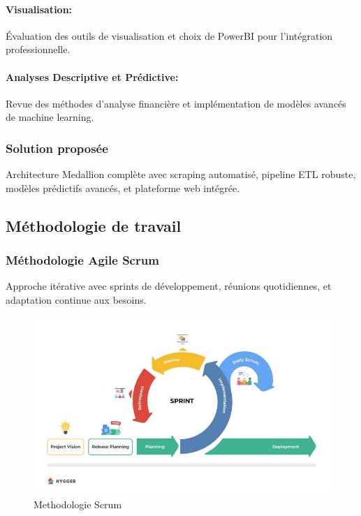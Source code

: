 \paragraph{Visualisation:}
Évaluation des outils de visualisation et choix de PowerBI pour l'intégration professionnelle.

\paragraph{Analyses Descriptive et Prédictive:}
Revue des méthodes d'analyse financière et implémentation de modèles avancés de machine learning.

\subsubsection{Solution proposée}
Architecture Medallion complète avec scraping automatisé, pipeline ETL robuste, modèles prédictifs avancés, et plateforme web intégrée.

\subsection{Méthodologie de travail}
\subsubsection{Méthodologie Agile Scrum}
Approche itérative avec sprints de développement, réunions quotidiennes, et adaptation continue aux besoins.
\begin{figure}[H]
    \centering
    \includegraphics[width=\figwidth]{img/scrum.png}
    \caption{Methodologie Scrum}
    \label{fig:Methodologie Scrum}
\end{figure}

